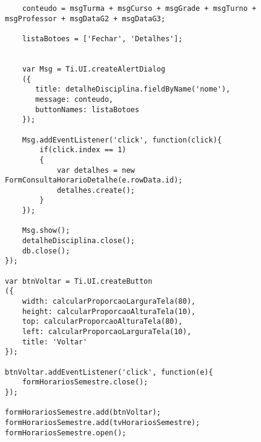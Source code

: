 \begin{lstlisting}
	conteudo = msgTurma + msgCurso + msgGrade + msgTurno + msgProfessor + msgDataG2 + msgDataG3;
	
	listaBotoes = ['Fechar', 'Detalhes'];

	
 	var Msg = Ti.UI.createAlertDialog
	({
	   title: detalheDisciplina.fieldByName('nome'),
	   message: conteudo,
	   buttonNames: listaBotoes
	});
	
	Msg.addEventListener('click', function(click){
		if(click.index == 1)
		{
			var detalhes = new FormConsultaHorarioDetalhe(e.rowData.id);
			detalhes.create();
		}
	});
	
	Msg.show();
	detalheDisciplina.close();
	db.close();
});

var btnVoltar = Ti.UI.createButton
({
	width: calcularProporcaoLarguraTela(80),
	height: calcularProporcaoAlturaTela(10),
	top: calcularProporcaoAlturaTela(80),
    left: calcularProporcaoLarguraTela(10),
    title: 'Voltar'
});

btnVoltar.addEventListener('click', function(e){
	formHorariosSemestre.close();
});
		
formHorariosSemestre.add(btnVoltar);
formHorariosSemestre.add(tvHorariosSemestre);
formHorariosSemestre.open();
\end{lstlisting}

